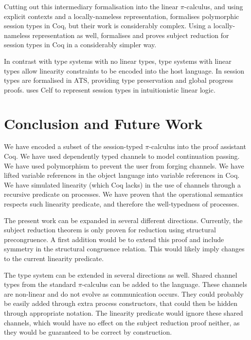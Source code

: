 \documentclass{mproj}
\newcommand{\picalc}{$\pi$-calculus}
\begin{document}
Cutting out this intermediary formalisation into the linear \picalc{}, and using explicit contexts and a locally-nameless \cite{Chargueraud2012} representation, \cite{Goto2016} formalises polymorphic session types in Coq, but their work is considerably complex. Using a locally-nameless representation as well, \cite{Ferreiraa} formalises and proves subject reduction for session types in Coq in a considerably simpler way.

In contrast with type systems with no linear types, type systems with linear types allow linearity constraints to be encoded into the host language. In \cite{Xi2016} session types are formalised in ATS, providing type preservation and global progress proofs. \cite{Bock2016} uses Celf to represent session types in intuitionistic linear logic.

\chapter{Conclusion and Future Work}\label{conclusion}

We have encoded a subset of the session-typed \picalc{} into the proof assistant Coq. We have used dependently typed channels to model continuation passing. We have used polymorphism to prevent the user from forging channels. We have lifted variable references in the object language into variable references in Coq. We have simulated linearity (which Coq lacks) in the use of channels through a recursive predicate on processes. We have proven that the operational semantics respects such linearity predicate, and therefore the well-typedness of processes.

The present work can be expanded in several different directions. Currently, the subject reduction theorem is only proven for reduction using structural precongruence. A first addition would be to extend this proof and include symmetry in the structural congruence relation. This would likely imply changes to the current linearity predicate.

The type system can be extended in several directions as well. Shared channel types from the standard \picalc{} can be added to the language. These channels are non-linear and do not evolve as communication occurs. They could probably be easily added through extra process constructors, that could then be hidden through appropriate notation. The linearity predicate would ignore these shared channels, which would have no effect on the subject reduction proof neither, as they would be guaranteed to be correct by construction.
\end{document}
